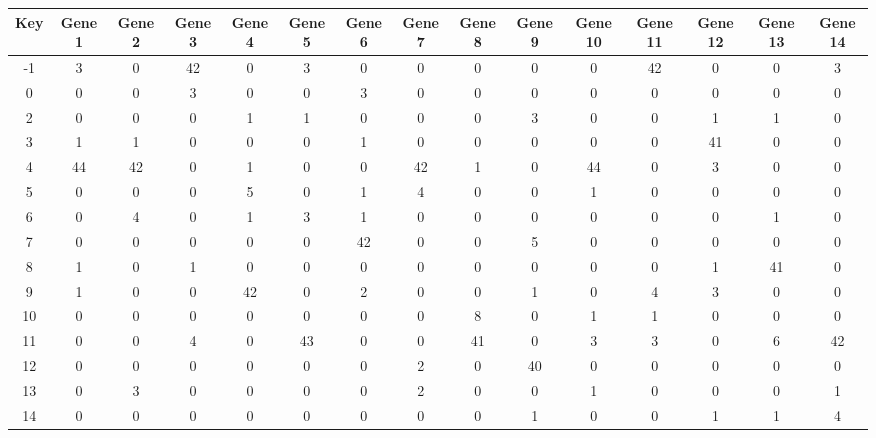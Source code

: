 \begin{tabular}{|c|c|c|c|c|c|c|c|c|c|c|c|c|c|c|}
\hline
Key & Gene 1 & Gene 2 & Gene 3 & Gene 4 & Gene 5 & Gene 6 & Gene 7 & Gene 8 & Gene 9 & Gene 10 & Gene 11 & Gene 12 & Gene 13 & Gene 14 \\
\hline
-1 & 3 & 0 & 42 & 0 & 3 & 0 & 0 & 0 & 0 & 0 & 42 & 0 & 0 & 3 \\
0 & 0 & 0 & 3 & 0 & 0 & 3 & 0 & 0 & 0 & 0 & 0 & 0 & 0 & 0 \\
2 & 0 & 0 & 0 & 1 & 1 & 0 & 0 & 0 & 3 & 0 & 0 & 1 & 1 & 0 \\
3 & 1 & 1 & 0 & 0 & 0 & 1 & 0 & 0 & 0 & 0 & 0 & 41 & 0 & 0 \\
4 & 44 & 42 & 0 & 1 & 0 & 0 & 42 & 1 & 0 & 44 & 0 & 3 & 0 & 0 \\
5 & 0 & 0 & 0 & 5 & 0 & 1 & 4 & 0 & 0 & 1 & 0 & 0 & 0 & 0 \\
6 & 0 & 4 & 0 & 1 & 3 & 1 & 0 & 0 & 0 & 0 & 0 & 0 & 1 & 0 \\
7 & 0 & 0 & 0 & 0 & 0 & 42 & 0 & 0 & 5 & 0 & 0 & 0 & 0 & 0 \\
8 & 1 & 0 & 1 & 0 & 0 & 0 & 0 & 0 & 0 & 0 & 0 & 1 & 41 & 0 \\
9 & 1 & 0 & 0 & 42 & 0 & 2 & 0 & 0 & 1 & 0 & 4 & 3 & 0 & 0 \\
10 & 0 & 0 & 0 & 0 & 0 & 0 & 0 & 8 & 0 & 1 & 1 & 0 & 0 & 0 \\
11 & 0 & 0 & 4 & 0 & 43 & 0 & 0 & 41 & 0 & 3 & 3 & 0 & 6 & 42 \\
12 & 0 & 0 & 0 & 0 & 0 & 0 & 2 & 0 & 40 & 0 & 0 & 0 & 0 & 0 \\
13 & 0 & 3 & 0 & 0 & 0 & 0 & 2 & 0 & 0 & 1 & 0 & 0 & 0 & 1 \\
14 & 0 & 0 & 0 & 0 & 0 & 0 & 0 & 0 & 1 & 0 & 0 & 1 & 1 & 4 \\
\hline
\end{tabular}